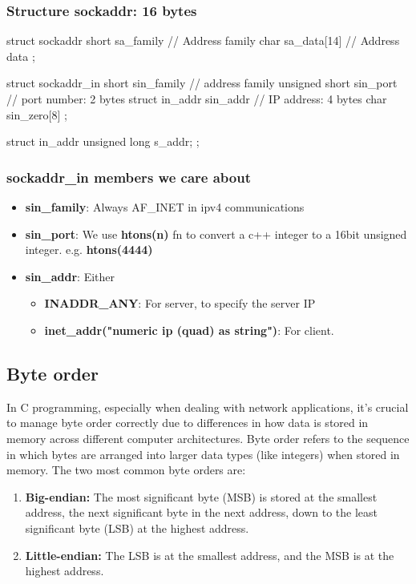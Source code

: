 \documentclass{report}
\begin{document}
    \bigbreak \noindent 
    \subsubsection{Structure sockaddr: 16 bytes}
    \bigbreak \noindent 
    \begin{cppcode}
        struct sockaddr {
            short       sa_family   // Address family
            char        sa_data[14] // Address data
        };

        struct sockaddr_in {
            short               sin_family   // address family
            unsigned short      sin_port     // port number: 2 bytes
            struct in_addr      sin_addr     // IP address: 4 bytes
            char                sin_zero[8]
        };

        struct in_addr {
            unsigned long       s_addr;
        };
    \end{cppcode}

    \bigbreak \noindent 
    \subsubsection{sockaddr\_in members we care about}
    \bigbreak \noindent 
    \begin{itemize}
        \item \textbf{sin\_family}: Always AF\_INET in ipv4 communications
        \item \textbf{sin\_port}: We use \textbf{htons(n)} fn to convert a c++ integer to a 16bit unsigned integer. e.g. \textbf{htons(4444)}
        \item \textbf{sin\_addr}: Either
            \begin{itemize}
                \item \textbf{INADDR\_ANY}: For server, to specify the server IP
                \item \textbf{inet\_addr("numeric ip (quad) as string")}: For client.
            \end{itemize}
    \end{itemize}
    \bigbreak \noindent 
    \subsection{Byte order}
    \bigbreak \noindent 
    In C programming, especially when dealing with network applications, it's crucial to manage byte order correctly due to differences in how data is stored in memory across different computer architectures. Byte order refers to the sequence in which bytes are arranged into larger data types (like integers) when stored in memory. The two most common byte orders are:
    \begin{enumerate}
        \item \textbf{Big-endian:} The most significant byte (MSB) is stored at the smallest address, the next significant byte in the next address, down to the least significant byte (LSB) at the highest address.
        \item \textbf{Little-endian:} The LSB is at the smallest address, and the MSB is at the highest address.
    \end{enumerate}
\end{document}
